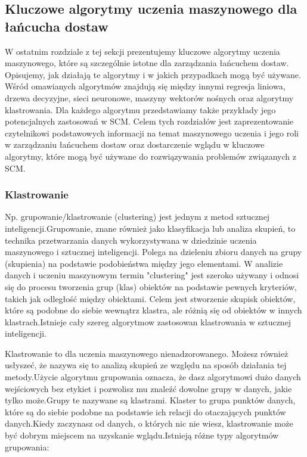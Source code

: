 \newpage
\par
\subsection{Kluczowe algorytmy uczenia maszynowego dla łańcucha dostaw}
    W ostatnim rozdziale z tej sekcji prezentujemy kluczowe algorytmy uczenia maszynowego, które są szczególnie istotne dla zarządzania łańcuchem dostaw. Opisujemy, jak działają te algorytmy i w jakich przypadkach mogą być używane. Wśród omawianych algorytmów znajdują się między innymi regresja liniowa, drzewa decyzyjne, sieci neuronowe, maszyny wektorów nośnych oraz algorytmy klastrowania. Dla każdego algorytmu przedstawiamy także przykłady jego potencjalnych zastosowań w SCM.
Celem tych rozdziałów jest zaprezentowanie czytelnikowi podstawowych informacji na temat maszynowego uczenia i jego roli w zarządzaniu łańcuchem dostaw oraz dostarczenie wglądu w kluczowe algorytmy, które mogą być używane do rozwiązywania problemów związanych z SCM.




\subsubsection{Klastrowanie}

 Np. grupowanie/klastrowanie (clustering) jest jednym z metod sztucznej inteligencji.Grupowanie, znane również jako klasyfikacja lub analiza skupień, to technika przetwarzania danych wykorzystywana w dziedzinie uczenia maszynowego i sztucznej inteligencji. Polega na dzieleniu zbioru danych na grupy (skupienia) na podstawie podobieństwa między jego elementami. W analizie danych i uczeniu maszynowym termin "clustering" jest szeroko używany i odnosi się do procesu tworzenia grup (klas) obiektów na podstawie pewnych kryteriów, takich jak odległość między obiektami. Celem jest stworzenie skupisk obiektów, które są podobne do siebie wewnątrz klastra, ale różnią się od obiektów w innych klastrach.Istnieje cały szereg algorytmow zastosowan klastrowania w sztucznej inteligencji.

  Klastrowanie to dla uczenia maszynowego nienadzorowanego. Możesz również usłyszeć, że nazywa się to analizą skupień ze względu na sposób działania tej metody.Użycie algorytmu grupowania oznacza, że dasz algorytmowi dużo danych wejściowych bez etykiet i pozwolisz mu znaleźć dowolne grupy w danych, jakie tylko może.Grupy te nazywane są klastrami. Klaster to grupa punktów danych, które są do siebie podobne na podstawie ich relacji do otaczających punktów danych.Kiedy zaczynasz od danych, o których nic nie wiesz, klastrowanie może być dobrym miejscem na uzyskanie wglądu.Istnieją różne typy algorytmów grupowania:
  
